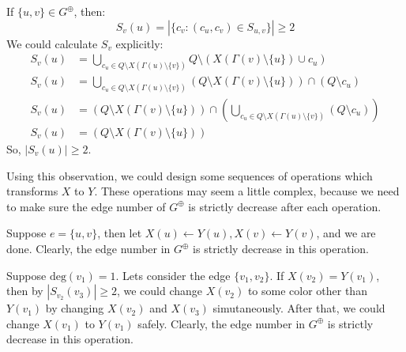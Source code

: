 \documentclass{article}
\begin{document}
\begin{tcolorbox}[title = An Interesting Observation(2)]
  If $\{u, v\} \in G^\oplus$, then:
  \[
    S_v(u) = |\{c_v: (c_u, c_v) \in S_{u,v}\}| \geq 2
  \]
  \tcblower
  We could calculate $S_v$ explicitly:
  \begin{align*}
    S_v(u) &= \bigcup_{c_u\in Q\setminus X(\Gamma(u)\setminus\{v\})} Q\setminus (X(\Gamma(v)\setminus\{u\}) \cup c_u) \\
    S_v(u) &= \bigcup_{c_u\in Q\setminus X(\Gamma(u)\setminus\{v\})} (Q\setminus X(\Gamma(v)\setminus\{u\})) \cap (Q\setminus c_u)\\
    S_v(u) &= (Q\setminus X(\Gamma(v)\setminus\{u\})) \cap ( \bigcup_{c_u\in Q\setminus X(\Gamma(u)\setminus\{v\})} (Q\setminus c_u)) \\
    S_v(u) &= (Q\setminus X(\Gamma(v)\setminus\{u\}))
  \end{align*}
  So, $|S_v(u)| \geq 2$.
\end{tcolorbox}
Using this observation, we could design some sequences of operations which transforms $X$ to $Y$. These operations may seem a little complex, because we need to make sure the edge number of $G^\oplus$ is strictly decrease after each operation.
\begin{tcolorbox}[title = Eliminate all the isolated edges in $G^\oplus$]
  Suppose $e = \{u, v\}$, then let $X(u)\gets Y(u), X(v)\gets Y(v)$, and we are done. Clearly, the edge number in $G^\oplus$ is strictly decrease in this operation.
\end{tcolorbox}
\begin{tcolorbox}[title = Eliminate all the $1$-degree vertices in $G^\oplus$]
  \begin{center}
  \end{center}
  \tcblower
Suppose $\mbox{deg}(v_1) = 1$. Lets consider the edge $\{v_1,
v_2\}$. If $X(v_2) = Y(v_1)$, then by $|S_{v_2}(v_3)|\geq 2$, we could
change $X(v_2)$ to some color other than $Y(v_1)$ by changing $X(v_2)$
and $X(v_3)$ simutaneously. After that, we could change $X(v_1)$ to
$Y(v_1)$ safely. Clearly, the edge number in $G^\oplus$ is strictly decrease in this operation.
\end{tcolorbox}
\end{document}
